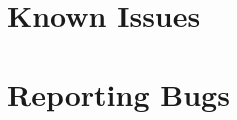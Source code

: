 \documentclass{manual}
\begin{document}



















\appendix

\chapter{Known Issues}

\chapter{Reporting Bugs}





\renewcommand{\indexname}{Module Index}

\renewcommand{\indexname}{Index}
\end{document}

